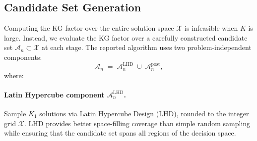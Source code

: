 \documentclass[12pt]{article}
\theoremstyle{plain}
\theoremstyle{definition}
\theoremstyle{remark}
\begin{document}
\subsection{Candidate Set Generation}\label{subsec:candidate_set}

Computing the KG factor over the entire solution space $\mathcal{X}$ is infeasible when $K$ is large. Instead, we evaluate the KG factor over a carefully constructed candidate set $\mathcal{A}_n \subset \mathcal{X}$ at each stage. The reported algorithm uses two problem-independent components:
\begin{equation}\label{eq:candidate_set}
  \mathcal{A}_n \;=\; \mathcal{A}_n^{\mathrm{LHD}} \;\cup\; \mathcal{A}_n^{\mathrm{post}},
\end{equation}
where:

\paragraph{Latin Hypercube component $\mathcal{A}_n^{\mathrm{LHD}}$.}
Sample $K_1$ solutions via Latin Hypercube Design (LHD), rounded to the integer grid $\mathcal{X}$. LHD provides better space-filling coverage than simple random sampling while ensuring that the candidate set spans all regions of the decision space.
\end{document}

